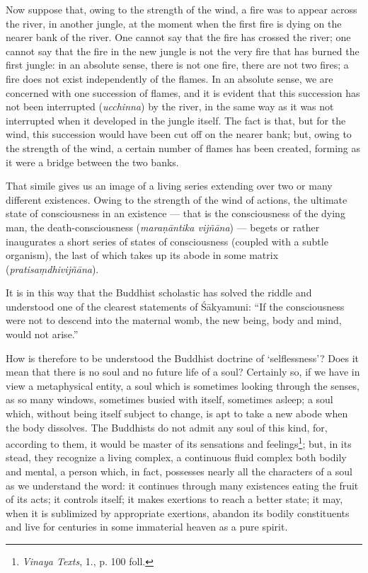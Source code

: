 \documentclass[a4paper, 11pt, oneside, english, landscape]{article}
\begin{document}
Now suppose that, owing to the strength of the wind, a fire was to appear across the river, in another jungle, at the moment when the first fire is dying on the nearer bank of the river. One cannot say that the fire has crossed the river; one cannot say that the fire in the new jungle is not the very fire that has burned the first jungle: in an absolute sense, there is not one fire, there are not two fires; a fire does not exist independently of the flames. In an absolute sense, we are concerned with one succession of flames, and it is evident that this succession has not been interrupted (\emph{ucchinna}) by the river, in the same way as it was not interrupted when it developed in the jungle itself. The fact is that, but for the wind, this succession would have been cut off on the nearer bank; but, owing to the strength of the wind, a certain number of flames has been created, forming as it were a bridge between the two banks.

That simile gives us an image of a living series extending over two or many different existences. Owing to the strength of the wind of actions, the ultimate state of consciousness in an existence --- that is the consciousness of the dying man, the death-consciousness (\emph{maraṇāntika vijñāna}) --- begets or rather inaugurates a short series of states of consciousness (coupled with a subtle organism), the last of which takes up its abode in some matrix (\emph{pratisaṃdhivijñāna}).

It is in this way that the Buddhist scholastic has solved the riddle and understood one of the clearest statements of Śākyamuni: ``If the consciousness were not to descend into the maternal womb, the new being, body and mind, would not arise.''

How is therefore to be understood the Buddhist doctrine of `selflessness'? Does it mean that there is no soul and no future life of a soul? Certainly so, if we have in view a metaphysical entity, a soul which is sometimes looking through the senses, as so many windows, sometimes busied with itself, sometimes asleep; a soul which, without being itself subject to change, is apt to take a new abode when the body dissolves. The Buddhists do not admit any soul of this kind, for, according to them, it would be master of its sensations and feelings\footnote{\emph{Vinaya Texts}, 1., p. 100 foll.}; but, in its stead, they recognize a living complex, a continuous fluid complex both bodily and mental, a person which, in fact, possesses nearly all the characters of a soul as we understand the word: it continues through many existences eating the fruit of its acts; it controls itself; it makes exertions to reach a better state; it may, when it is sublimized by appropriate exertions, abandon its bodily constituents and live for centuries in some immaterial heaven as a pure spirit.
\end{document}

